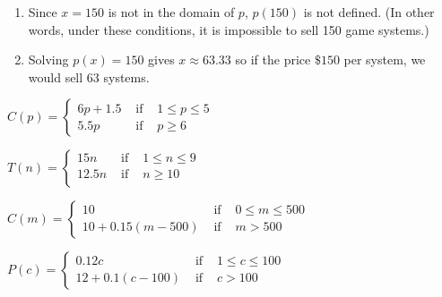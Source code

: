 \begin{exenum}
\begin{enumerate}
\item   Since $x = 150$ is not in the domain of $p$, $p(150)$ is not defined.  (In other words, under these conditions, it is impossible to sell 150 game systems.)

\item Solving $p(x) = 150$ gives $x \approx 63.33$ so if the price  $\$150$ per system, we would sell $63$ systems.

\end{enumerate}

\item ${\displaystyle C(p) = \left\{ \begin{array}{rcl} 6p + 1.5 & \mbox{ if } & 1 \leq p \leq 5 \\
                                                            5.5p & \mbox{ if } & p\geq 6
                                     \end{array} \right. }$



\item  ${\displaystyle T(n) = \left\{ \begin{array}{rcl} 15n & \mbox{ if } & 1 \leq n \leq 9 \\
                                                            12.5n & \mbox{ if } & n \geq 10 \\
                                     \end{array} \right. }$


\item ${\displaystyle C(m) = \left\{ \begin{array}{rcl} 10 & \mbox{ if } & 0 \leq m \leq 500 \\
                                                            10+0.15(m-500) & \mbox{ if } & m > 500
                                     \end{array} \right. }$

\item ${\displaystyle P(c) = \left\{ \begin{array}{rcl} 0.12c & \mbox{ if } & 1 \leq c \leq 100 \\
                                                            12 + 0.1(c-100) & \mbox{ if } & c > 100
                                     \end{array} \right. }$

\item

\begin{enumerate}


\end{enumerate}
\end{exenum}

